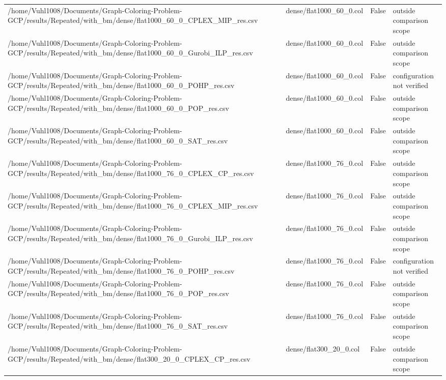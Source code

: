 \begin{table}[htbp]
\begin{tabular}{llll}
/home/Vuhl1008/Documents/Graph-Coloring-Problem-GCP/results/Repeated/with\_bm/dense/flat1000\_60\_0\_CPLEX\_MIP\_res.csv & dense/flat1000\_60\_0.col & False & outside comparison scope \\
/home/Vuhl1008/Documents/Graph-Coloring-Problem-GCP/results/Repeated/with\_bm/dense/flat1000\_60\_0\_Gurobi\_ILP\_res.csv & dense/flat1000\_60\_0.col & False & outside comparison scope \\
/home/Vuhl1008/Documents/Graph-Coloring-Problem-GCP/results/Repeated/with\_bm/dense/flat1000\_60\_0\_POHP\_res.csv & dense/flat1000\_60\_0.col & False & configuration not verified \\
/home/Vuhl1008/Documents/Graph-Coloring-Problem-GCP/results/Repeated/with\_bm/dense/flat1000\_60\_0\_POP\_res.csv & dense/flat1000\_60\_0.col & False & outside comparison scope \\
/home/Vuhl1008/Documents/Graph-Coloring-Problem-GCP/results/Repeated/with\_bm/dense/flat1000\_60\_0\_SAT\_res.csv & dense/flat1000\_60\_0.col & False & outside comparison scope \\
/home/Vuhl1008/Documents/Graph-Coloring-Problem-GCP/results/Repeated/with\_bm/dense/flat1000\_76\_0\_CPLEX\_CP\_res.csv & dense/flat1000\_76\_0.col & False & outside comparison scope \\
/home/Vuhl1008/Documents/Graph-Coloring-Problem-GCP/results/Repeated/with\_bm/dense/flat1000\_76\_0\_CPLEX\_MIP\_res.csv & dense/flat1000\_76\_0.col & False & outside comparison scope \\
/home/Vuhl1008/Documents/Graph-Coloring-Problem-GCP/results/Repeated/with\_bm/dense/flat1000\_76\_0\_Gurobi\_ILP\_res.csv & dense/flat1000\_76\_0.col & False & outside comparison scope \\
/home/Vuhl1008/Documents/Graph-Coloring-Problem-GCP/results/Repeated/with\_bm/dense/flat1000\_76\_0\_POHP\_res.csv & dense/flat1000\_76\_0.col & False & configuration not verified \\
/home/Vuhl1008/Documents/Graph-Coloring-Problem-GCP/results/Repeated/with\_bm/dense/flat1000\_76\_0\_POP\_res.csv & dense/flat1000\_76\_0.col & False & outside comparison scope \\
/home/Vuhl1008/Documents/Graph-Coloring-Problem-GCP/results/Repeated/with\_bm/dense/flat1000\_76\_0\_SAT\_res.csv & dense/flat1000\_76\_0.col & False & outside comparison scope \\
/home/Vuhl1008/Documents/Graph-Coloring-Problem-GCP/results/Repeated/with\_bm/dense/flat300\_20\_0\_CPLEX\_CP\_res.csv & dense/flat300\_20\_0.col & False & outside comparison scope \\

\end{tabular}
\end{table}
